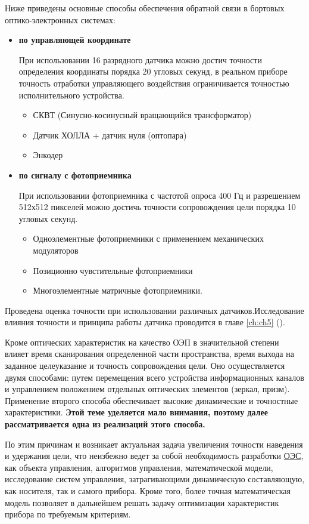 Ниже приведены основные способы обеспечения обратной связи в бортовых оптико-электронных системах:
\begin{itemize}
	\item \textbf{по управляющей координате}
	
	При использовании 16 разрядного датчика можно достич точности определения координаты порядка 20 угловых секунд, в реальном приборе точность отработки управляющего воздействия ограничивается точностью исполнительного устройства.
	
	\begin{itemize}
		\item СКВТ (Синусно-косинусный вращающийся трансформатор)
		\item Датчик ХОЛЛА + датчик нуля (оптопара)
		\item Энкодер
	\end{itemize}
		
	\item \textbf{по сигналу с фотоприемника} 
	
	При использовании фотоприемника с частотой опроса 400 Гц и разрешением 512х512 пикселей можно достичь точности сопровождения цели порядка 10 угловых секунд.
	
	\begin{itemize}
		\item Одноэлементные фотоприемники с применением механических модуляторов
		\item Позиционно чувстительные фотоприемники		
		\item Многоэлементные матричные фотоприемники.	
	\end{itemize}
	
	
\end{itemize}
Проведена оценка точности при использовании различных датчиков.Исследование влияния точности и принципа работы датчика проводится в главе \ref{ch:ch5} ().

Кроме оптических характеристик на качество ОЭП в значительной степени влияет время сканирования определенной части пространства, время выхода на заданное целеуказание и точность сопровождения цели. Оно осуществляется двумя способами: путем перемещения всего устройства информационных каналов и управлением положением отдельных оптических элементов (зеркал, призм). Применение второго способа обеспечивает высокие динамические и точностные характеристики. \textbf{Этой теме уделяется мало внимания, поэтому далее рассматривается одна из реализаций этого способа.}

По этим причинам и возникает актуальная задача увеличения точности наведения и удержания цели, что неизбежно ведет за собой необходимость разработки \hyperref[acroEOS]{ОЭС}, как объекта управления, алгоритмов управления, математической модели, исследование систем управления, затрагивающими динамическую составляющую, как носителя, так и самого прибора. Кроме того, более точная математическая модель позволяет в дальнейшем решать задачу оптимизации характеристик прибора по требуемым критериям.
 
